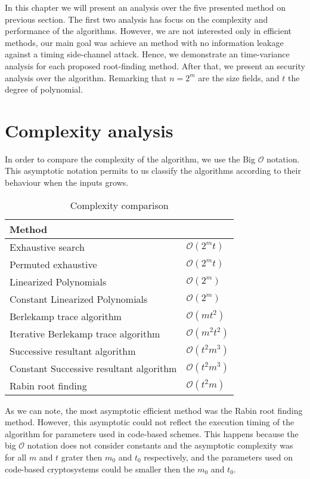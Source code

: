 In this chapter we will present an analysis over the five presented method on previous section. The first two analysis has focus on the complexity and performance of the algorithms. However, we are not interested only in efficient methods, our main goal was achieve an method with no information leakage against a timing side-channel attack. Hence, we demonstrate an time-variance analysis for each proposed root-finding method. After that, we present an security analysis over the algorithm. Remarking that $n = 2^m$ are the size fields, and $t$ the degree of polynomial.

\section{Complexity analysis}
In order to compare the complexity of the algorithm, we use the Big $\mathcal{O}$ notation. This asymptotic notation permits to us classify the algorithms according to their behaviour when the inputs grows. 

\begin{table}[ht]
\centering
\label{tab:complexity}
\caption{Complexity comparison}
\begin{tabular}{ll}
Method                                  &                \\ \hline
Exhaustive search                       & $\mathcal{O}(2^mt)$ \\
Permuted exhaustive                     & $\mathcal{O}(2^mt)$ \\
Linearized Polynomials                  & $\mathcal{O}(2^m)$ \\
Constant Linearized Polynomials         & $\mathcal{O}(2^m)$ \\
Berlekamp trace algorithm               & $\mathcal{O}(mt^2)$ \\
Iterative Berlekamp trace algorithm     & $\mathcal{O}(m^2t^2)$ \\
Successive resultant algorithm          & $\mathcal{O}(t^2m^3)$ \\
Constant Successive resultant algorithm & $\mathcal{O}(t^2m^3)$ \\
Rabin root finding                      & $\mathcal{O}(t^2m)$
\end{tabular}
\end{table}

As we can note, the most asymptotic efficient method was the Rabin root finding method. However, this asymptotic could not reflect the execution timing of the algorithm for parameters used in code-based schemes. This happens because the big $\mathcal{O}$ notation does not consider constants and the asymptotic complexity was for all $m$ and $t$ grater then $m_0$ and $t_0$ respectively, and the parameters used on code-based cryptosystems could be smaller then the $m_0$ and $t_0$.



